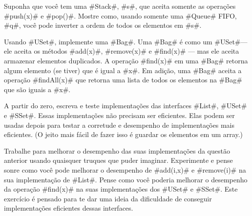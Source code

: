 \begin{exc}
  Suponha que você tem uma 
 #Stack#, #s#, que aceita somente as operações #push(x)#
  e #pop()#. Mostre como, usando somente uma #Queue# FIFO, #q#,
  você pode inverter a ordem de todos os elementos em #s#.
\end{exc}

\begin{exc}
Usando #USet#, implemente uma #Bag#.  Uma #Bag# é como um #USet#---ele aceita os métodos 
#add(x)#, #remove(x)# e #find(x)# --- mas ele aceita armazenar elementos duplicados. A operação #find(x)# em uma #Bag# retorna
  algum elemento (se tiver) que é igual a #x#. Em adição, uma 
  #Bag# aceita a operação #findAll(x)# que retorna uma lista de todos os elementos
  na #Bag# que são iguais a #x#.
\end{exc}

\begin{exc}
  A partir do zero, escreva e teste implementações das interfaces #List#, #USet# 
  e #SSet#. Essas implementações não precisam ser eficientes. Elas podem ser usadas depois para testar a corretude e desempenho de implementações mais eficientes. (O jeito mais fácil de fazer isso é guardar os elementos em um array.)
\end{exc}

\begin{exc}
Trabalhe para melhorar o desempenho das suas implementações da questão anterior usando quaisquer truques que puder imaginar. Experimente e pense sonre como você pode melhorar o desempenho de #add(i,x)# e #remove(i)# na sua implementação de #List#. Pense como você poderia melhorar o desempenho da operação #find(x)# na suas implementações dos #USet# e #SSet#. Este exercício é pensado para te dar uma ideia da dificuldade de conseguir implementações eficientes dessas interfaces.
\end{exc}




